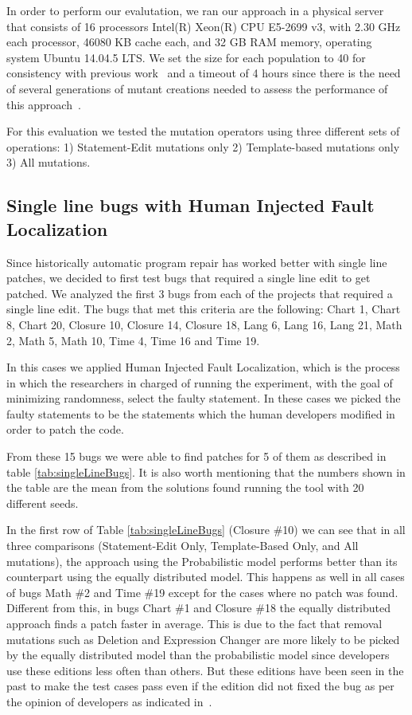 \documentclass[conference]{IEEEtran}
\begin{document}
In order to perform our evalutation, we ran our approach in a physical server that 
consists of 16 processors Intel(R) Xeon(R) CPU E5-2699 v3, with 2.30 GHz each 
processor, 46080 KB cache each, and 32 GB RAM memory, operating system Ubuntu 
14.04.5 LTS. We set the size for each population to 40 for consistency with 
previous work~\cite{legoues12,kim2013} and a timeout of 4 hours since there is 
the need of several generations of mutant creations needed to assess the 
performance of this approach~\cite{arcuri11}.

For this evaluation we tested the mutation operators using three different sets 
of operations: 1) Statement-Edit mutations only 2) Template-based mutations 
only 3) All mutations.

\subsection{Single line bugs with Human Injected Fault Localization}
Since historically automatic program repair has worked better with single line 
patches, we decided to first test bugs that required a single line edit to get 
patched. We analyzed the first 3 bugs from each of the projects that required a 
single line edit. The bugs that met this criteria are the following: Chart 1, 
Chart 8, Chart 20, Closure 10, Closure 14, Closure 18, Lang 6, Lang 16, Lang 21, 
Math 2, Math 5, Math 10, Time 4, Time 16 and Time 19.

In this cases we applied Human Injected Fault Localization, which is the process in which the researchers in charged of running the experiment, with the goal of minimizing randomness, select the faulty statement. In these cases we picked the faulty statements to be the statements which the human developers modified in order to patch the code.

From these 15 bugs we were able to find patches for 5 of them as described in table \ref{tab:singleLineBugs}. It is also worth mentioning that the numbers shown in the table are the mean from the solutions found running the tool with 20 different seeds. 

In the first row of Table \ref{tab:singleLineBugs} (Closure \#10) we can see that in all three comparisons (Statement-Edit Only, Template-Based Only, and All mutations), the approach using the Probabilistic model performs better than its counterpart using the equally distributed model. This happens as well in all cases of bugs Math \#2 and Time \#19 except for the cases where no patch was found. Different from this, in bugs Chart \#1 and Closure \#18 the equally distributed approach finds a patch faster in average. This is due to the fact that removal mutations such as Deletion and Expression Changer are more likely to be picked by the equally distributed model than the probabilistic model since developers use these editions less often than others. But these editions have been seen in the past to make the test cases pass even if the edition did not fixed the bug as per the opinion of developers as indicated in~\cite{kim2013}.
\end{document}
